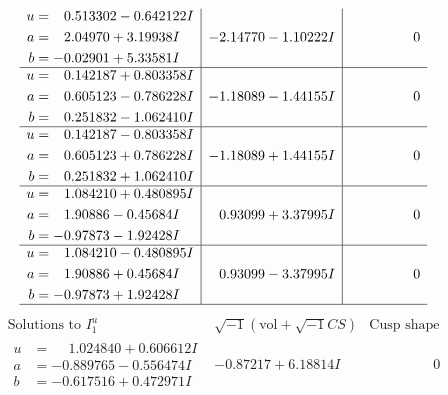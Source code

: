 \documentclass[1p]{elsarticle_modified}
\theoremstyle{definition}
\newcommand{\I}{\sqrt{-1}}
\begin{document}
$$\begin{array}{c|c|c}
\begin{aligned}
u &= \phantom{-}0.513302 - 0.642122 I \\
a &= \phantom{-}2.04970 + 3.19938 I \\
b &= -0.02901 + 5.33581 I\end{aligned}
 & -2.14770 - 1.10222 I & \phantom{-0.000000 } 0 \\ \hline\begin{aligned}
u &= \phantom{-}0.142187 + 0.803358 I \\
a &= \phantom{-}0.605123 - 0.786228 I \\
b &= \phantom{-}0.251832 - 1.062410 I\end{aligned}
 & -1.18089 - 1.44155 I & \phantom{-0.000000 } 0 \\ \hline\begin{aligned}
u &= \phantom{-}0.142187 - 0.803358 I \\
a &= \phantom{-}0.605123 + 0.786228 I \\
b &= \phantom{-}0.251832 + 1.062410 I\end{aligned}
 & -1.18089 + 1.44155 I & \phantom{-0.000000 } 0 \\ \hline\begin{aligned}
u &= \phantom{-}1.084210 + 0.480895 I \\
a &= \phantom{-}1.90886 - 0.45684 I \\
b &= -0.97873 - 1.92428 I\end{aligned}
 & \phantom{-}0.93099 + 3.37995 I & \phantom{-0.000000 } 0 \\ \hline\begin{aligned}
u &= \phantom{-}1.084210 - 0.480895 I \\
a &= \phantom{-}1.90886 + 0.45684 I \\
b &= -0.97873 + 1.92428 I\end{aligned}
 & \phantom{-}0.93099 - 3.37995 I & \phantom{-0.000000 } 0\\
 \hline 
 \end{array}$$\newpage$$\begin{array}{c|c|c}  
\text{Solutions to }I^u_{1}& \I (\text{vol} + \sqrt{-1}CS) & \text{Cusp shape}\\
 \hline 
\begin{aligned}
u &= \phantom{-}1.024840 + 0.606612 I \\
a &= -0.889765 - 0.556474 I \\
b &= -0.617516 + 0.472971 I\end{aligned}
 & -0.87217 + 6.18814 I & \phantom{-0.000000 } 0 \\ \hline\begin{aligned}

\end{aligned}
\end{array}$$
\end{document}
